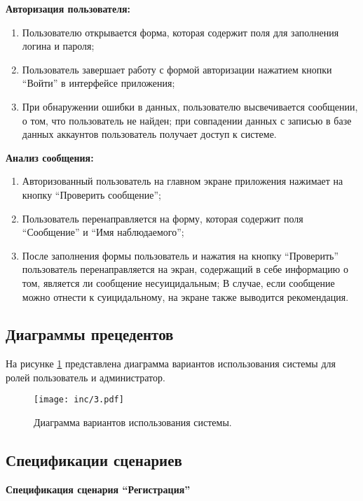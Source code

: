 \textbf{Авторизация пользователя:}
\begin{enumerate}
\item Пользователю открывается форма, которая содержит поля для заполнения логина и пароля;
\item Пользователь завершает работу с формой авторизации нажатием кнопки ``Войти'' в интерфейсе приложения;
\item При обнаружении ошибки в данных, пользователю высвечивается сообщении, о том, что пользователь не найден; при совпадении данных с записью в базе данных аккаунтов пользователь получает доступ к системе.
\end{enumerate}

\textbf{Анализ сообщения:}
\begin{enumerate}
\item Авторизованный пользователь на главном экране приложения нажимает на кнопку ``Проверить сообщение'';
\item Пользователь перенаправляется на форму, которая содержит поля ``Сообщение'' и ``Имя наблюдаемого'';
\item После заполнения формы пользователь и нажатия на кнопку ``Проверить'' пользователь перенаправляется на экран, содержащий в себе информацию о том, является ли сообщение несуицидальным; В случае, если сообщение можно отнести к суицидальному, на экране также выводится рекомендация.
\end{enumerate}

\subsection{Диаграммы прецедентов}

На рисунке \ref{img:usecase} представлена диаграмма вариантов использования системы для ролей пользователь и администратор.

\begin{figure}[H]
	\centering
	\texttt{[image: inc/3.pdf]}
	\caption{ Диаграмма вариантов использования системы.}
	\label{img:usecase}
\end{figure}

\subsection{Спецификации сценариев}

\textbf{Спецификация сценария ``Регистрация''}

